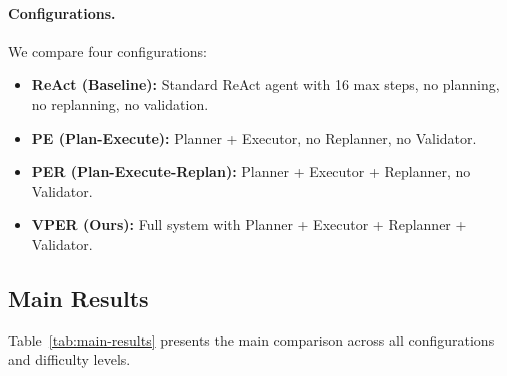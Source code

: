 \documentclass{article}
\begin{document}
\paragraph{Configurations.}
We compare four configurations:
\begin{itemize}[leftmargin=1.5em]
    \item \textbf{ReAct (Baseline):} Standard ReAct agent with 16 max steps, no planning, no replanning, no validation.
    \item \textbf{PE (Plan-Execute):} Planner + Executor, no Replanner, no Validator.
    \item \textbf{PER (Plan-Execute-Replan):} Planner + Executor + Replanner, no Validator.
    \item \textbf{VPER (Ours):} Full system with Planner + Executor + Replanner + Validator.
\end{itemize}

\subsection{Main Results}

Table~\ref{tab:main-results} presents the main comparison across all configurations and difficulty levels.
\end{document}
